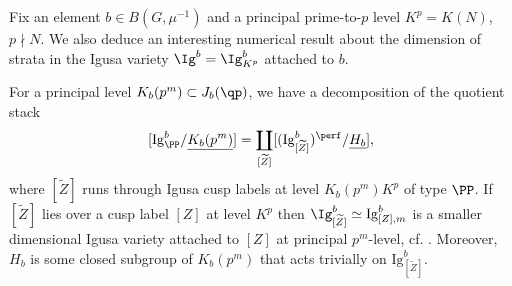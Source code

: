 \documentclass[letterpaper,11pt]{amsart}
\begin{document}
Fix an element $b\in B(G,\mu^{-1})$ and a principal prime-to-$p$ level $K^p=K(N)$, $p\nmid N$. We also deduce an interesting numerical result about the dimension of strata in the Igusa variety $\Ig^b=\Ig^b_{K^p}$ attached to $b$. 

\begin{lemma}\label{lemma: IgusaVarietyStackyQuotient}
    For a principal level $K_b(p^m)\subset J_b(\qp)$, we have a decomposition of the quotient stack 
    \[[\mathrm{Ig}^{b}_{\PP}/\underline{K_b(p^m)}]= \coprod_{[\widetilde{Z}]}[(\mathrm{Ig}^{b}_{[\widetilde{Z}]})^{\perf}/\underline{H_b}],\] where $[\widetilde{Z}]$ runs through Igusa cusp labels at level $K_b(p^m)K^p$ of type $\PP$. If $[\widetilde{Z}]$ lies over a cusp label $[Z]$ at level $K^p$ then $\Ig^{b}_{[\widetilde{Z}]}\simeq \mathrm{Ig}^{b}_{[Z], m}$ is a smaller dimensional Igusa variety attached to $[Z]$ at principal $p^m$-level, cf. \cite[Theorem 3.3.15]{CS2}. Moreover, $H_b$ is some closed subgroup of $K_b(p^m)$ that acts trivially on $\mathrm{Ig}^{b}_{[\widetilde{Z}]}$.
\end{lemma}
\end{document}
